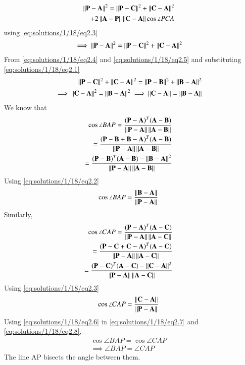 \begin{align}
 \begin{split}
\left\lVert\mathbf{P-A}\right\rVert^2=\left\lVert\mathbf{P-C}\right\rVert^2+\left\lVert\mathbf{C-A}\right\rVert^2\\ 
+2\left\lVert\mathbf{A}-\mathbf{P}\right\rVert\left\lVert\mathbf{C}-\mathbf{A}\right\rVert\cos\angle PCA \\
\end{split}
\end{align}
using \eqref{eq:solutions/1/18/eq2.3}
\begin{align}
 \begin{split}
 \implies \left\lVert\mathbf{P-A}\right\rVert^2=\left\lVert\mathbf{P-C}\right\rVert^2+\left\lVert\mathbf{C-A}\right\rVert^2 \label{eq:solutions/1/18/eq2.5}
 \end{split}
\end{align}
From \eqref{eq:solutions/1/18/eq2.4} and \eqref{eq:solutions/1/18/eq2.5} and substituting \eqref{eq:solutions/1/18/eq2.1}
\begin{align}
\left\lVert\mathbf{P-C}\right\rVert^2+\left\lVert\mathbf{C-A}\right\rVert^2=\left\lVert\mathbf{P-B}\right\rVert^2+\left\lVert\mathbf{B-A}\right\rVert^2 \\
\implies \left\lVert\mathbf{C-A}\right\rVert^2=\left\lVert\mathbf{B-A}\right\rVert^2
\implies \left\lVert\mathbf{C-A}\right\rVert=\left\lVert\mathbf{B-A}\right\rVert \label{eq:solutions/1/18/eq2.6}
\end{align}
We know that 
\begin{align}
 \cos\angle BAP=
   \frac{(\mathbf P -\mathbf A)^T(\mathbf{A}-\mathbf{B})}{\left\lVert\mathbf{P}-\mathbf{A}\right\rVert \left\lVert\mathbf{A}-\mathbf{B}\right\rVert } \\
   =  \frac{(\mathbf P -\mathbf{B} +\mathbf{B} -\mathbf A)^T(\mathbf{A}-\mathbf{B})}{\left\lVert\mathbf{P}-\mathbf{A}\right\rVert \left\lVert\mathbf{A}-\mathbf{B}\right\rVert } \\
   =\frac{(\mathbf P -\mathbf B)^T (\mathbf{A}-\mathbf{B})- \left\lVert\mathbf{B-A}\right\rVert^2}{\left\lVert\mathbf{P}-\mathbf{A}\right\rVert \left\lVert\mathbf{A}-\mathbf{B}\right\rVert }
\end{align}
Using \eqref{eq:solutions/1/18/eq2.2}
\begin{align}
\cos\angle BAP=  \frac{\left\lVert\mathbf{B-A}\right\rVert}{\left\lVert\mathbf{P}-\mathbf{A}\right\rVert  }\label{eq:solutions/1/18/eq2.7}
\end{align}
Similarly,
\begin{align}
 \cos\angle CAP =
 \frac{(\mathbf P -\mathbf A)^T(\mathbf{A}-\mathbf{C})}{\left\lVert\mathbf{P}-\mathbf{A}\right\rVert \left\lVert\mathbf{A}-\mathbf{C}\right\rVert } \\
   =  \frac{(\mathbf P -\mathbf{C} +\mathbf{C} -\mathbf A)^T(\mathbf{A}-\mathbf{C})}{\left\lVert\mathbf{P}-\mathbf{A}\right\rVert \left\lVert\mathbf{A}-\mathbf{C}\right\rVert } \\
   =\frac{(\mathbf P -\mathbf C)^T (\mathbf{A}-\mathbf{C})- \left\lVert\mathbf{C-A}\right\rVert^2}{\left\lVert\mathbf{P}-\mathbf{A}\right\rVert \left\lVert\mathbf{A}-\mathbf{C}\right\rVert }
\end{align}
Using \eqref{eq:solutions/1/18/eq2.3}
\begin{align}
\cos\angle CAP=  \frac{\left\lVert\mathbf{C-A}\right\rVert}{\left\lVert\mathbf{P}-\mathbf{A}\right\rVert  }\label{eq:solutions/1/18/eq2.8}
  \end{align}
Using \eqref{eq:solutions/1/18/eq2.6} in \eqref{eq:solutions/1/18/eq2.7} and \eqref{eq:solutions/1/18/eq2.8},
\begin{align}
\cos\angle BAP=\cos\angle CAP \\
\implies \angle BAP=\angle CAP
\end{align}
The line AP bisects the angle between them.


